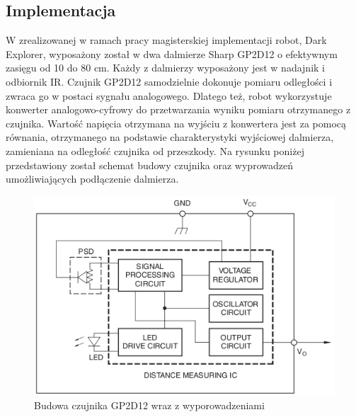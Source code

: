 \subsection{Implementacja}
W zrealizowanej w ramach pracy magisterskiej implementacji robot, Dark Explorer,
wyposażony został w dwa dalmierze Sharp GP2D12 o efektywnym zasięgu od 10 do 80
cm. Każdy z dalmierzy wyposażony jest w nadajnik i odbiornik IR. Czujnik
GP2D12 samodzielnie dokonuje pomiaru odległości i zwraca go w postaci sygnału
analogowego. Dlatego też, robot wykorzystuje konwerter analogowo-cyfrowy do
przetwarzania wyniku pomiaru otrzymanego z czujnika. Wartość napięcia otrzymana
na wyjściu z konwertera jest za pomocą równania, otrzymanego na podstawie
charakterystyki wyjściowej dalmierza, zamieniana na odległość czujnika od
przeszkody. Na rysunku poniżej przedstawiony został schemat budowy czujnika oraz
wyprowadzeń umożliwiających podłączenie dalmierza.

\begin{figure}[hb]
 \centering
 \includegraphics[width=150mm]{../images/ch04/gp2d12_build.png}
 \caption{Budowa czujnika GP2D12 wraz z wyporowadzeniami\cite{GP2D12DataSheet}}
 \label{fig:SharpGP2D12}
\end{figure}

